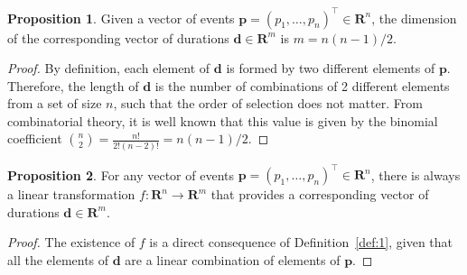 \documentclass{bmcart}
\theoremstyle{definition}
\newtheorem{proposition}{Proposition}[section]
\begin{document}
\begin{proposition}
  Given a vector of events $\boldsymbol{p}=(p_1,\ldots,p_n)^\top\in\mathbf{R}^n$, the dimension of the corresponding vector of durations $\boldsymbol{d}\in\mathbf{R}^m$ is $m=n(n-1)/2$.
\end{proposition}

\begin{proof}
  By definition, each element of $\boldsymbol{d}$ is formed by two different elements of $\boldsymbol{p}$. Therefore, the length of $\boldsymbol{d}$ is the number of combinations of 2 different elements from a set of size $n$, such that the order of selection does not matter. From combinatorial theory, it is well known that this value is given by the binomial coefficient $\binom{n}{2}=\frac{n!}{2!(n-2)!}=n(n-1)/2$.
\end{proof}

\begin{proposition}
 For any vector of events $\boldsymbol{p}=(p_1,\ldots,p_n)^\top\in\mathbf{R}^n$, there is always a linear transformation $f:\mathbf{R}^n\to\mathbf{R}^m$ that provides a corresponding vector of durations $\boldsymbol{d}\in\mathbf{R}^m$.
 \label{prop:2}
\end{proposition}

\begin{proof}
 The existence of $f$ is a direct consequence of Definition~\ref{def:1}, given that all the elements of $\boldsymbol{d}$ are a linear combination of elements of $\boldsymbol{p}$. 
\end{proof}
\end{document}
